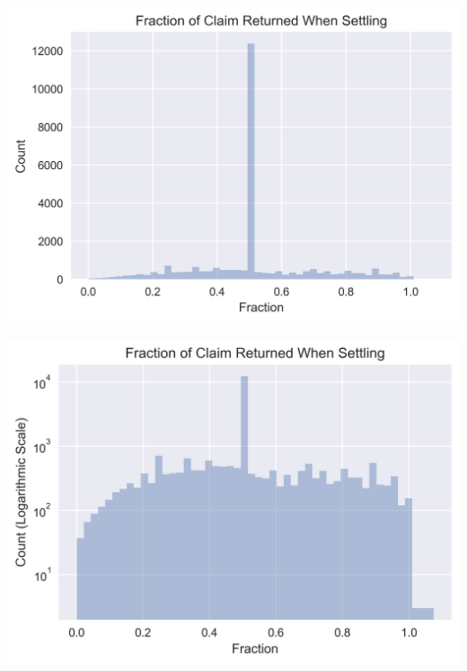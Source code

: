 \documentclass{beamer}
\begin{document}
\begin{frame}
	\includegraphics[keepaspectratio, width = \textwidth, height = 0.5\textheight]{../plots/settled}
	\begin{flushright}
		\includegraphics[keepaspectratio, width = \textwidth, height = 0.5\textheight]{../plots/log_settled}
	\end{flushright}
\end{frame}
\end{document}
